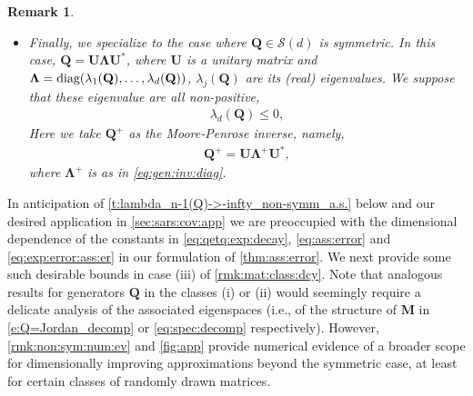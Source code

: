 \documentclass[9pt,twocolumn,twoside]{pnas-new}
\makeatletter
\newcommand{\?}{\textbf{?}}
\newcommand{\diag}{\textnormal{diag}}
\newcommand{\QQ}{\mathbf{Q}}
\newcommand{\LLambda}{\boldsymbol{\Lambda}}
\newcommand{\M}{\mathbf{M}}
\newcommand{\UU}{\mathbf{U}}
\newtheorem{@remark}{\bf Remark}
\newenvironment{remark}{\begin{@remark}\rm}{\end{@remark}}
\makeatother
\begin{document}
\begin{remark}
\begin{itemize}
\begin{align}
      \end{align}
    The complex numbers $\lambda_j(\QQ)^+$,
    $j = 1, \ldots, d$ are defined as in \eqref{eq:eig:gen:inv}.
  \item[(iii)] Finally, we specialize to the case where
    $\QQ \in \mathcal{S}(d)$ is symmetric. In this case,
    $\QQ = \UU \LLambda \UU^*$, where $\UU$ is a unitary matrix and
    $\LLambda = \diag (\lambda_1(\QQ), \ldots ,\lambda_d(\QQ))$,
    $\lambda_j(\QQ)$ are its (real) eigenvalues.  We suppose that
    these eigenvalue are all non-positive,
    \begin{align}\label{eq:ev:d:cond:sym:case}
      \lambda_d({\mathbf Q}) \leq 0,
    \end{align}
    Here we take $\QQ^+$ as the Moore-Penrose inverse, namely,
    \begin{align}\label{eq:MP:inv:sym:case}
      \QQ^+ = \UU \LLambda^+ \UU^*,
   \end{align}
    where $\LLambda^+$ is as in \eqref{eq:gen:inv:diag}.   
  \end{itemize}
\end{remark}
In anticipation of \cref{t:lambda_n-1(Q)->-infty_non-symm_a.s.} below
and our desired application in \cref{sec:sars:cov:app} we are
preoccupied with the dimensional dependence of the constants in
\eqref{eq:qetq:exp:decay}, \eqref{eq:ass:error}
and \eqref{eq:exp:error:ass:er} in our formulation of
\cref{thm:ass:error}.  We next provide some such desirable bounds in
case (iii) of \cref{rmk:mat:class:dcy}.  Note that analogous results
for generators $\QQ$ in the classes (i) or (ii) would seemingly
require a delicate analysis of the associated eigenspaces (i.e., of the
structure of $\M$ in \eqref{e:Q=Jordan_decomp} or
\eqref{eq:spec:decomp} respectively).  However,
\cref{rmk:non:sym:num:ev} and \cref{fig:app} provide numerical evidence
of a broader scope for dimensionally improving approximations beyond
the symmetric case, at least for certain classes of randomly drawn
matrices.
\end{document}
